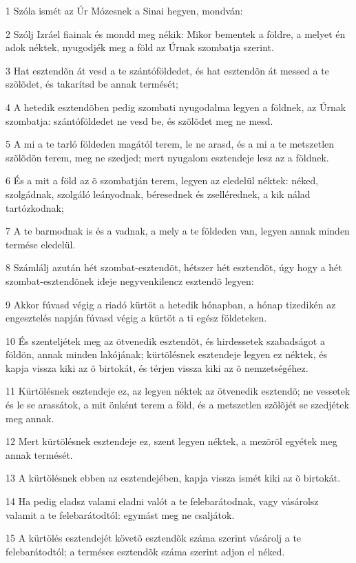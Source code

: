 \par 1 Szóla ismét az Úr Mózesnek a Sinai hegyen, mondván:
\par 2 Szólj Izráel fiainak és mondd meg nékik: Mikor bementek a földre, a melyet én adok néktek, nyugodjék meg a föld az Úrnak szombatja szerint.
\par 3 Hat esztendõn át vesd a te szántóföldedet, és hat esztendõn át messed a te szõlõdet, és takarítsd be annak termését;
\par 4 A hetedik esztendõben pedig szombati nyugodalma legyen a földnek, az Úrnak szombatja: szántóföldedet ne vesd be, és szõlõdet meg ne mesd.
\par 5 A mi a te tarló földeden magától terem, le ne arasd, és a mi a te metszetlen szõlõdön terem, meg ne szedjed; mert nyugalom esztendeje lesz az a földnek.
\par 6 És a mit a föld az õ szombatján terem, legyen az eledelül néktek: néked, szolgádnak, szolgáló leányodnak, béresednek és zsellérednek, a kik nálad tartózkodnak;
\par 7 A te barmodnak is és a vadnak, a mely a te földeden van, legyen annak minden termése eledelül.
\par 8 Számlálj azután hét szombat-esztendõt, hétszer hét esztendõt, úgy hogy a hét szombat-esztendõnek ideje negyvenkilencz esztendõ legyen:
\par 9 Akkor fúvasd végig a riadó kürtöt a hetedik hónapban, a hónap tizedikén az engesztelés napján fúvasd végig a kürtöt a ti egész földeteken.
\par 10 És szenteljétek meg az ötvenedik esztendõt, és hirdessetek szabadságot a földön, annak minden lakójának; kürtölésnek esztendeje legyen ez néktek, és kapja vissza kiki az õ birtokát, és térjen vissza kiki az õ nemzetségéhez.
\par 11 Kürtölésnek esztendeje ez, az legyen néktek az ötvenedik esztendõ; ne vessetek és le se arassátok, a mit önként terem a föld, és a metszetlen szõlõjét se szedjétek meg annak.
\par 12 Mert kürtölésnek esztendeje ez, szent legyen néktek, a mezõrõl egyétek meg annak termését.
\par 13 A kürtölésnek ebben az esztendejében, kapja vissza ismét kiki az õ birtokát.
\par 14 Ha pedig eladsz valami eladni valót a te felebarátodnak, vagy vásárolsz valamit a te felebarátodtól: egymást meg ne csaljátok.
\par 15 A kürtölés esztendejét követõ esztendõk száma szerint vásárolj a te felebarátodtól; a terméses esztendõk száma szerint adjon el néked.
